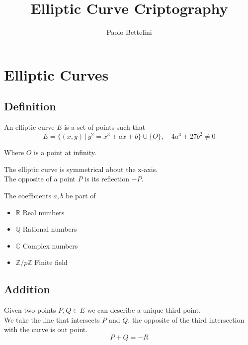 \documentclass{article}
\title{Elliptic Curve Criptography}
\author{Paolo Bettelini}
\date{}
\begin{document}
\maketitle
\tableofcontents
\pagebreak

\section{Elliptic Curves}

\subsection{Definition}

An elliptic curve \(E\) is a set of points such that
\[
	E=\{(x,y)\,|\,y^2=x^3+ax+b\}\cup\{O\},\quad 4a^3+27b^2\neq 0
\]

\begin{center}
\end{center}
Where \(O\) is a point at infinity.

The elliptic curve is symmetrical about the x-axis.\\
The opposite of a point \(P\) is its reflection \(-P\).

The coefficients \(a,b\) be part of
\begin{itemize}
	\item \(\mathbb{R}\) Real numbers
	\item \(\mathbb{Q}\) Rational numbers
	\item \(\mathbb{C}\) Complex numbers
	\item \(\mathbb{Z}/p\mathbb{Z}\) Finite field
\end{itemize}

\subsection{Addition}

Given two points \(P,Q\in E\) we can describe a unique third point.\\
We take the line that intersects \(P\) and \(Q\), the opposite of the third intersection with the curve is out point.
\[
	P+Q=-R
\]
\end{document}
